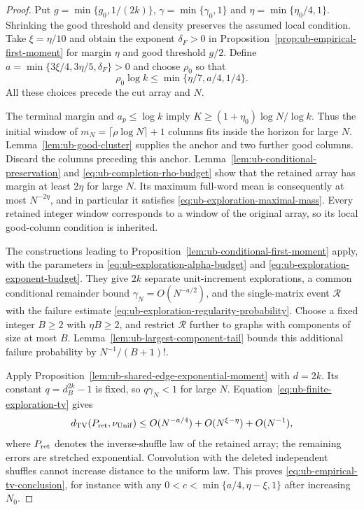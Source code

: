 \documentclass[11pt]{article}
\numberwithin{equation}{section}
\newcommand{\TV}{\mathrm{TV}}
\newcommand{\Unif}{\mathrm{Unif}}
\newcommand{\1}{\mathbf 1}
\newcommand{\dTV}{d_{\TV}}
\newcommand{\nuUnif}{\nu_{\Unif}}
\begin{document}
\begin{proof}
Put $g=\min\{g_0,1/(2k)\}$,
$\gamma=\min\{\gamma_0,1\}$ and
$\eta=\min\{\eta_0/4,1\}$. Shrinking the good threshold and
density preserves the assumed local condition.
Take $\xi=\eta/10$ and obtain the exponent $\delta_F>0$ in
Proposition~\ref{prop:ub-empirical-first-moment} for margin $\eta$
and good threshold $g/2$. Define
$a=\min\{3\xi/4,3\eta/5,\delta_F\}>0$ and choose $\rho_0$ so that
\begin{equation}
\label{eq:ub-completion-rho-budget}
 \rho_0\log k\le\min\{\eta/7,a/4,1/4\}.
\end{equation}
All these choices precede the cut array and $N$.

The terminal margin and $a_p\le\log k$ imply
$K\ge(1+\eta_0)\log N/\log k$. Thus the initial window of
$m_N=\lceil\rho\log N\rceil+1$ columns fits inside the horizon
for large $N$. Lemma~\ref{lem:ub-good-cluster} supplies the anchor
and two further good columns. Discard the columns preceding this
anchor. Lemma~\ref{lem:ub-conditional-preservation} and
\eqref{eq:ub-completion-rho-budget} show that the retained array
has margin at least $2\eta$ for large $N$. Its maximum full-word
mean is consequently at most $N^{-2\eta}$, and in particular it
satisfies \eqref{eq:ub-exploration-maximal-mass}.
Every retained integer window corresponds to a window of the
original array, so its local good-column condition is inherited.

The constructions leading to
Proposition~\ref{lem:ub-conditional-first-moment} apply, with the
parameters in \eqref{eq:ub-exploration-alpha-budget} and
\eqref{eq:ub-exploration-exponent-budget}. They give $2k$ separate
unit-increment explorations, a common conditional remainder bound
$\gamma_N=O(N^{-a/2})$, and the single-matrix event $\mathcal R$
with the failure estimate
\eqref{eq:ub-exploration-regularity-probability}.
Choose a fixed integer $B\ge2$ with $\eta B\ge2$, and restrict
$\mathcal R$ further to graphs with components of size at most $B$.
Lemma~\ref{lem:ub-largest-component-tail} bounds this additional
failure probability by $N^{-1}/(B+1)!$.

Apply Proposition~\ref{lem:ub-shared-edge-exponential-moment} with
$d=2k$. Its constant $q=d_B^{2k}-1$ is fixed, so $q\gamma_N<1$
for large $N$. Equation~\eqref{eq:ub-finite-exploration-tv} gives
\[
 \dTV(P_{\rm ret},\nuUnif)
 \le O(N^{-a/4})+O(N^{\xi-\eta})+O(N^{-1}),
\]
where $P_{\rm ret}$ denotes the inverse-shuffle law of the retained
array; the remaining errors are stretched exponential.
Convolution with the deleted independent shuffles cannot increase
distance to the uniform law. This proves
\eqref{eq:ub-empirical-tv-conclusion}, for instance with any
$0<c<\min\{a/4,\eta-\xi,1\}$ after increasing $N_0$.
\end{proof}
\end{document}
